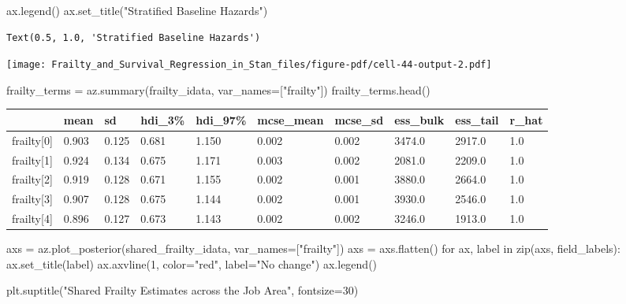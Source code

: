 \documentclass[
  letterpaper,
  DIV=11,
  numbers=noendperiod]{scrartcl}
\newenvironment{Shaded}{\begin{snugshade}}{\end{snugshade}}
\newcommand{\BuiltInTok}[1]{\textcolor[rgb]{0.00,0.23,0.31}{#1}}
\newcommand{\ControlFlowTok}[1]{\textcolor[rgb]{0.00,0.23,0.31}{#1}}
\newcommand{\DecValTok}[1]{\textcolor[rgb]{0.68,0.00,0.00}{#1}}
\newcommand{\KeywordTok}[1]{\textcolor[rgb]{0.00,0.23,0.31}{#1}}
\newcommand{\NormalTok}[1]{\textcolor[rgb]{0.00,0.23,0.31}{#1}}
\newcommand{\OperatorTok}[1]{\textcolor[rgb]{0.37,0.37,0.37}{#1}}
\newcommand{\StringTok}[1]{\textcolor[rgb]{0.13,0.47,0.30}{#1}}
\begin{document}
\begin{Shaded}
\begin{Highlighting}[]
\NormalTok{ax.legend()}
\NormalTok{ax.set\_title(}\StringTok{"Stratified Baseline Hazards"}\NormalTok{)}
\end{Highlighting}
\end{Shaded}

\begin{verbatim}
Text(0.5, 1.0, 'Stratified Baseline Hazards')
\end{verbatim}

\texttt{[image: Frailty\_and\_Survival\_Regression\_in\_Stan\_files/figure-pdf/cell-44-output-2.pdf]}

\begin{Shaded}
\begin{Highlighting}[]
\NormalTok{frailty\_terms }\OperatorTok{=}\NormalTok{ az.summary(frailty\_idata, var\_names}\OperatorTok{=}\NormalTok{[}\StringTok{"frailty"}\NormalTok{])}
\NormalTok{frailty\_terms.head()}
\end{Highlighting}
\end{Shaded}

\begin{longtable}[]{@{}llllllllll@{}}
\toprule\noalign{}
& mean & sd & hdi\_3\% & hdi\_97\% & mcse\_mean & mcse\_sd & ess\_bulk &
ess\_tail & r\_hat \\
\midrule\noalign{}
\endhead
\bottomrule\noalign{}
\endlastfoot
frailty{[}0{]} & 0.903 & 0.125 & 0.681 & 1.150 & 0.002 & 0.002 & 3474.0
& 2917.0 & 1.0 \\
frailty{[}1{]} & 0.924 & 0.134 & 0.675 & 1.171 & 0.003 & 0.002 & 2081.0
& 2209.0 & 1.0 \\
frailty{[}2{]} & 0.919 & 0.128 & 0.671 & 1.155 & 0.002 & 0.001 & 3880.0
& 2664.0 & 1.0 \\
frailty{[}3{]} & 0.907 & 0.128 & 0.675 & 1.144 & 0.002 & 0.001 & 3930.0
& 2546.0 & 1.0 \\
frailty{[}4{]} & 0.896 & 0.127 & 0.673 & 1.143 & 0.002 & 0.002 & 3246.0
& 1913.0 & 1.0 \\
\end{longtable}

\begin{Shaded}
\begin{Highlighting}[]
\NormalTok{axs }\OperatorTok{=}\NormalTok{ az.plot\_posterior(shared\_frailty\_idata, var\_names}\OperatorTok{=}\NormalTok{[}\StringTok{"frailty"}\NormalTok{])}
\NormalTok{axs }\OperatorTok{=}\NormalTok{ axs.flatten()}
\ControlFlowTok{for}\NormalTok{ ax, label }\KeywordTok{in} \BuiltInTok{zip}\NormalTok{(axs, field\_labels):}
\NormalTok{    ax.set\_title(label) }
\NormalTok{    ax.axvline(}\DecValTok{1}\NormalTok{, color}\OperatorTok{=}\StringTok{"red"}\NormalTok{, label}\OperatorTok{=}\StringTok{"No change"}\NormalTok{)}
\NormalTok{    ax.legend()}

\NormalTok{plt.suptitle(}\StringTok{"Shared Frailty Estimates across the Job Area"}\NormalTok{, fontsize}\OperatorTok{=}\DecValTok{30}\NormalTok{)}
\end{Highlighting}
\end{Shaded}
\end{document}
